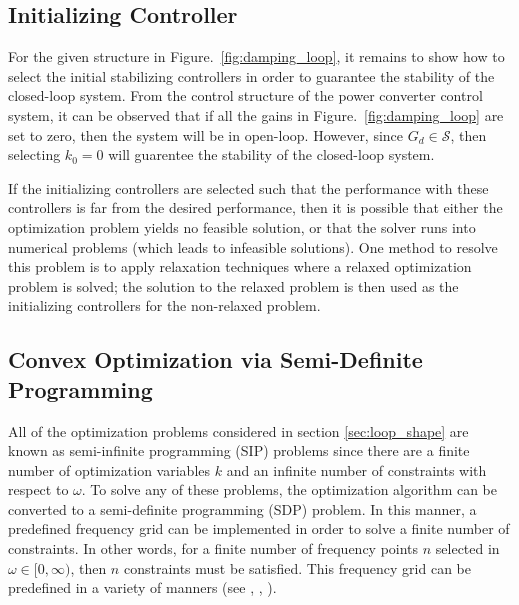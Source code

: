 \documentclass[a4paper, 10pt, conference]{ieeeconf}
\begin{document}
\subsection{Initializing Controller}
For the given structure in Figure.~\ref{fig:damping_loop}, it remains to show how to select the initial stabilizing controllers in order to guarantee the stability of the closed-loop system. From the control structure of the power converter control system, it can be observed that if all the gains in Figure.~\ref{fig:damping_loop} are set to zero, then the system will be in open-loop. However, since $G_d \in \mathscr{S}$, then selecting $k_0 = 0$ will guarentee the stability of the closed-loop system. 

If the initializing controllers are selected such that the performance with these controllers is far from the desired performance, then it is possible that either the optimization problem yields no feasible solution, or that the solver runs into numerical problems (which leads to infeasible solutions). One method to resolve this problem is to apply relaxation techniques where a relaxed optimization problem is solved; the solution to the relaxed problem is then used as the initializing controllers for the non-relaxed problem. 


\subsection{Convex Optimization via Semi-Definite Programming}
All of the optimization problems considered in section \ref{sec:loop_shape} are known as semi-infinite programming (SIP) problems since there are a finite number of optimization variables $k$ and an infinite number of constraints with respect to $\omega$. To solve any of these problems, the optimization algorithm can be converted to a semi-definite programming (SDP) problem. In this manner, a predefined frequency grid can be implemented in order to solve a finite number of constraints. In other words, for a finite number of frequency points $n$ selected in $\omega \in [0,\infty)$, then $n$ constraints must be satisfied. This frequency grid can be predefined in a variety of manners (see \cite{SVBB11}, \cite{GKL10b}, \cite{FR05}). 
\end{document}
